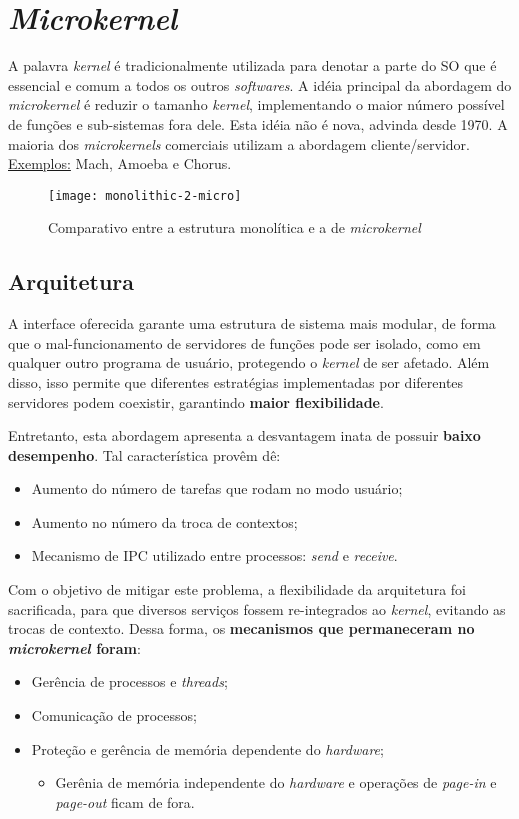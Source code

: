 \chapter{\textit{Microkernel}}
A palavra \textit{kernel} é tradicionalmente utilizada para denotar a parte do SO que é essencial e comum a todos os outros \textit{softwares}. A idéia principal da abordagem do \textit{microkernel} é reduzir o tamanho \textit{kernel}, implementando o maior número possível de funções e sub-sistemas fora dele. Esta idéia não é nova, advinda desde 1970. A maioria dos \textit{microkernels} comerciais utilizam a abordagem cliente/servidor. \underline{Exemplos:} Mach, Amoeba e Chorus.

\begin{figure}[H]
  \centering
  \texttt{[image: monolithic-2-micro]}
  \caption{Comparativo entre a estrutura monolítica e a de \textit{microkernel}}
  \label{fig:monolithic-2-micro}
\end{figure}

\section{Arquitetura}
A interface oferecida garante uma estrutura de sistema mais modular, de forma que o mal-funcionamento de servidores de funções pode ser isolado, como em qualquer outro programa de usuário, protegendo o \textit{kernel} de ser afetado. Além disso, isso permite que diferentes estratégias implementadas por diferentes servidores podem coexistir, garantindo \textbf{maior flexibilidade}.

Entretanto, esta abordagem apresenta a desvantagem inata de possuir \textbf{baixo desempenho}. Tal característica provêm dê:
\begin{itemize}
  \item Aumento do número de tarefas que rodam no modo usuário;
  \item Aumento no número da troca de contextos;
  \item Mecanismo de IPC utilizado entre processos: \textit{send} e \textit{receive}.
\end{itemize}

Com o objetivo de mitigar este problema, a flexibilidade da arquitetura foi sacrificada, para que diversos serviços fossem re-integrados ao \textit{kernel}, evitando as trocas de contexto. Dessa forma, os \textbf{mecanismos que permaneceram no \textit{microkernel} foram}:
\begin{itemize}
  \item Gerência de processos e \textit{threads};
  \item Comunicação de processos;
  \item Proteção e gerência de memória dependente do \textit{hardware};
  \begin{itemize}
    \item Gerênia de memória independente do \textit{hardware} e operações de \textit{page-in} e \textit{page-out} ficam de fora.
  \end{itemize}
\end{itemize}


